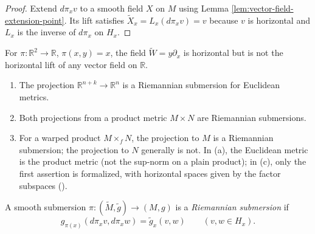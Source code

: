 \begin{proof}

\sketch Extend $d\pi_xv$ to a smooth field $X$ on $M$ using Lemma \ref{lem:vector-field-extension-point}. Its lift satisfies $\tilde X_x=L_x(d\pi_xv)=v$ because $v$ is horizontal and $L_x$ is the inverse of $d\pi_x$ on $H_x$.
\end{proof}

\begin{proposition}
\label{prop:horizontal-vector-field-not-lift}


For $\pi:\mathbb R^2\to\mathbb R$, $\pi(x,y)=x$, the field
$\tilde W=y\partial_x$ is horizontal but is not the horizontal lift of any
vector field on $\mathbb R$.
\end{proposition}

\begin{example}
\label{ex:riemannian-submersions}





\begin{enumerate}
\item[(a)] The projection $\mathbb R^{n+k}\to\mathbb R^n$ is a Riemannian submersion for Euclidean metrics.
\item[(b)] Both projections from a product metric $M\times N$ are Riemannian submersions.
\item[(c)] For a warped product $M\times_fN$, the projection to $M$ is a Riemannian submersion; the projection to $N$ generally is not. In (a), the Euclidean metric is the product metric (not the sup-norm on a plain product); in (c), only the first assertion is formalized, with horizontal spaces given by the factor subspaces ().
\end{enumerate}
\end{example}

\begin{definition}
\label{def:riemannian-submersion}





A smooth submersion $\pi:(\tilde M,\tilde g)\to(M,g)$ is a \emph{Riemannian submersion} if
\[
g_{\pi(x)}(d\pi_xv,d\pi_xw)=\tilde g_x(v,w)\qquad(v,w\in H_x).
\]
\end{definition}

